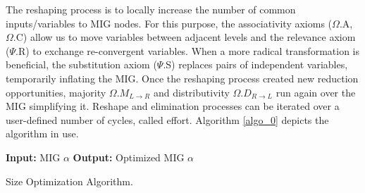 \documentclass[
	accentcolor=1c,%
	type=intern,
	marginpar=false,
	ruledheaders=section,
	class=report,
	BCOR=5mm,
      parskip=half-,
	fontsize=10pt
	]{tudapub}
\begin{document}
	The reshaping process is to locally increase the number of common inputs/variables to MIG nodes. For this purpose, the associativity axioms ($\Omega$.A, $\Omega$.C) allow us to move variables between adjacent levels and the relevance axiom ($\Psi$.R) to exchange re-convergent variables. When a more radical transformation is beneficial, the substitution axiom ($\Psi$.S) replaces pairs of independent variables, temporarily inflating the MIG. Once the reshaping process created new reduction opportunities, majority $\Omega.M_{L\rightarrow R}$ and distributivity $\Omega.D_{R\rightarrow L}$ run again over the MIG simplifying it. Reshape and elimination processes can be iterated over a user-defined number of cycles, called effort.
	Algorithm \ref{algo_0} depicts the algorithm in use.\newline

	\begin{algorithm}[H]
		\SetAlgoLined
		\textbf{Input:} MIG $\alpha$\;
		\textbf{Output:} Optimized MIG $\alpha$\;
		\caption{Size Optimization Algorithm.}
		\label{algo_0}
	\end{algorithm}
\end{document}
